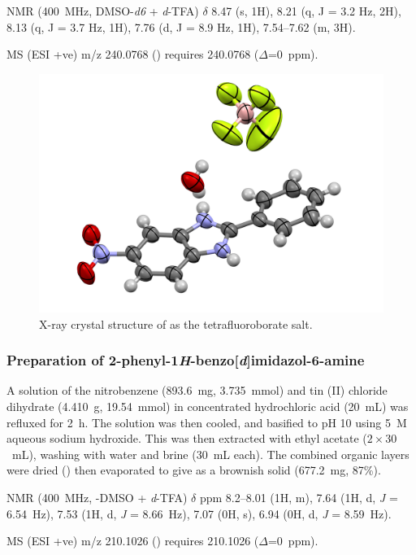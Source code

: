 \begin{refsection}
 NMR (400~MHz, DMSO-\emph{d6} + \textit{d}-TFA) $\delta$ 8.47 (s, 1H), 8.21 (q, J = 3.2 Hz, 2H), 8.13 (q, J = 3.7 Hz, 1H), 7.76 (d, J = 8.9 Hz, 1H), 7.54--7.62 (m, 3H).

MS (ESI +ve) m/z 240.0768 ()  requires 240.0768 ($\Delta$=0~ppm).

\begin{figure}[ht]
    \centering
    \includegraphics[width=0.8\linewidth]{Figures/rhs-nitro-xray.pdf}
    \caption{X-ray crystal structure of  as the tetrafluoroborate salt.}\label{fig:rhs-nitro-xray}
\end{figure}

\subsubsection[Preparation of \refcmpd{rhs-amine}]{Preparation of 2-phenyl-1\emph{H}-benzo[\emph{d}]imidazol-6-amine }
A solution of the nitrobenzene  (893.6~mg, 3.735~mmol) and tin (II) chloride dihydrate (4.410~g, 19.54~mmol) in concentrated hydrochloric acid (20~mL) was refluxed for 2~h.
The solution was then cooled, and basified to pH 10 using 5~M aqueous sodium hydroxide.
This was then extracted with ethyl acetate ($2\times30$~mL), washing with water and brine (30~mL each).
The combined organic layers were dried () then evaporated to give  as a brownish solid (677.2~mg, 87\%).

 NMR (400~MHz, -DMSO + \textit{d}-TFA) $\delta$ ppm 8.2--8.01 (1H, m), 7.64 (1H, d, \emph{J} = 6.54~Hz), 7.53 (1H, d, \emph{J} = 8.66~Hz), 7.07 (0H, s), 6.94 (0H, d, \emph{J} = 8.59~Hz).

MS (ESI +ve) m/z 210.1026 ()  requires 210.1026 ($\Delta$=0~ppm).


\end{refsection}
